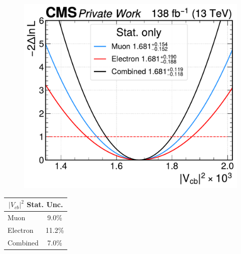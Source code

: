 \begin{minipage}{\linewidth}
    \begin{minipage}{0.74\linewidth}
        \begin{figure}[H]
        \centering
        \includegraphics[width=\linewidth]{fig//chap09-sigback/stat_like.pdf}
        
        
        \end{figure}
    \end{minipage}
    \hfill
    \begin{minipage}{0.25\linewidth}
        
        \begin{table}[H]
            \centering
            \begin{tabular}{l|c}
                \toprule
                \multicolumn{2}{c}{\textbf{$|V_{cb}|^2$ Stat. Unc.}} \\
                \midrule
                 Muon & 9.0\% \\
                 Electron & 11.2\% \\
                 Combined & 7.0\% \\
                 \bottomrule
            \end{tabular}
            \label{tab:my_label}
        \end{table}
    \end{minipage}
    
    \label{fig:stat_fit}
\end{minipage}


